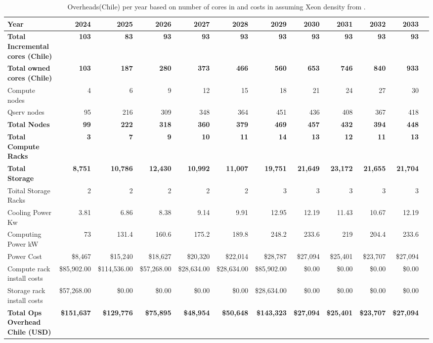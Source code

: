 \tiny \begin{longtable} { |p{}  |r  |r  |r  |r  |r  |r  |r  |r  |r  |r  |r |} 
\caption{Overheads(Chile) per year based on number of cores in  and costs in  assuming Xeon density from .  \label{tab:opsOverheadChile}}\\ 
\hline 
\textbf{Year}&\textbf{2024}&\textbf{2025}&\textbf{2026}&\textbf{2027}&\textbf{2028}&\textbf{2029}&\textbf{2030}&\textbf{2031}&\textbf{2032}&\textbf{2033} \\ \hline
\textbf{Total Incremental cores (Chile)}&\textbf{103}&\textbf{83}&\textbf{93}&\textbf{93}&\textbf{93}&\textbf{93}&\textbf{93}&\textbf{93}&\textbf{93}&\textbf{93} \\ \hline
\textbf{Total owned cores (Chile)}&\textbf{103}&\textbf{187}&\textbf{280}&\textbf{373}&\textbf{466}&\textbf{560}&\textbf{653}&\textbf{746}&\textbf{840}&\textbf{933} \\ \hline
{Compute nodes}&{4}&{6}&{9}&{12}&{15}&{18}&{21}&{24}&{27}&{30} \\ \hline
{Qserv nodes}&{95}&{216}&{309}&{348}&{364}&{451}&{436}&{408}&{367}&{418} \\ \hline
\textbf{Total Nodes}&\textbf{99}&\textbf{222}&\textbf{318}&\textbf{360}&\textbf{379}&\textbf{469}&\textbf{457}&\textbf{432}&\textbf{394}&\textbf{448} \\ \hline
\textbf{Total Compute Racks}&\textbf{3}&\textbf{7}&\textbf{9}&\textbf{10}&\textbf{11}&\textbf{14}&\textbf{13}&\textbf{12}&\textbf{11}&\textbf{13} \\ \hline
\textbf{Total Storage}&\textbf{8,751}&\textbf{10,786}&\textbf{12,430}&\textbf{10,992}&\textbf{11,007}&\textbf{19,751}&\textbf{21,649}&\textbf{23,172}&\textbf{21,655}&\textbf{21,704} \\ \hline
{Toital Storage Racks}&{2}&{2}&{2}&{2}&{2}&{3}&{3}&{3}&{3}&{3} \\ \hline
{Cooling Power Kw}&{3.81}&{6.86}&{8.38}&{9.14}&{9.91}&{12.95}&{12.19}&{11.43}&{10.67}&{12.19} \\ \hline
{Computing Power kW
}&{73}&{131.4}&{160.6}&{175.2}&{189.8}&{248.2}&{233.6}&{219}&{204.4}&{233.6} \\ \hline
{Power Cost}&{\$8,467}&{\$15,240}&{\$18,627}&{\$20,320}&{\$22,014}&{\$28,787}&{\$27,094}&{\$25,401}&{\$23,707}&{\$27,094} \\ \hline
{Compute rack install costs}&{\$85,902.00}&{\$114,536.00}&{\$57,268.00}&{\$28,634.00}&{\$28,634.00}&{\$85,902.00}&{\$0.00}&{\$0.00}&{\$0.00}&{\$0.00} \\ \hline
{Storage rack install costs}&{\$57,268.00}&{\$0.00}&{\$0.00}&{\$0.00}&{\$0.00}&{\$28,634.00}&{\$0.00}&{\$0.00}&{\$0.00}&{\$0.00} \\ \hline
\textbf{Total Ops Overhead Chile (USD)}&\textbf{\$151,637}&\textbf{\$129,776}&\textbf{\$75,895}&\textbf{\$48,954}&\textbf{\$50,648}&\textbf{\$143,323}&\textbf{\$27,094}&\textbf{\$25,401}&\textbf{\$23,707}&\textbf{\$27,094} \\ \hline
\end{longtable} \normalsize
